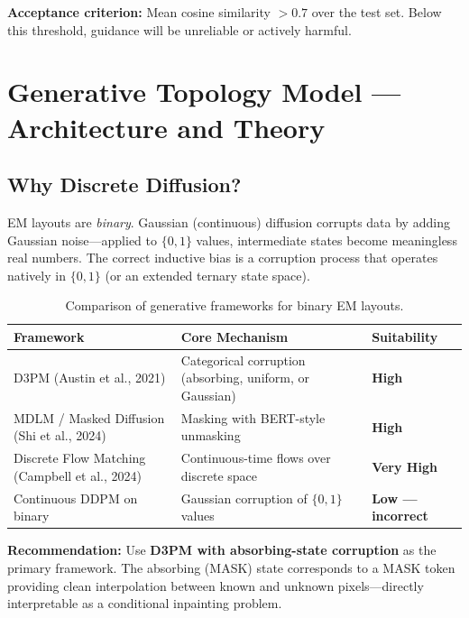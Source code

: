 \documentclass[12pt,a4paper]{article}
\theoremstyle{definition}
\theoremstyle{plain}
\theoremstyle{remark}
\begin{document}
\textbf{Acceptance criterion:} Mean cosine similarity $> 0.7$ over the test set.
Below this threshold, guidance will be unreliable or actively harmful.

\section{Generative Topology Model — Architecture and Theory}
\label{sec:generative}

\subsection{Why Discrete Diffusion?}

EM layouts are \emph{binary}.
Gaussian (continuous) diffusion corrupts data by adding Gaussian noise—applied to
$\{0,1\}$ values, intermediate states become meaningless real numbers.
The correct inductive bias is a corruption process that operates natively in
$\{0, 1\}$ (or an extended ternary state space).

\begin{table}[H]
\centering
\caption{Comparison of generative frameworks for binary EM layouts.}
\label{tab:gen_compare}
\begin{tabular}{lp{5.5cm}l}
\toprule
\textbf{Framework} & \textbf{Core Mechanism} & \textbf{Suitability} \\
\midrule
D3PM (Austin et al., 2021)
  & Categorical corruption (absorbing, uniform, or Gaussian)
  & \textbf{High} \\
MDLM / Masked Diffusion (Shi et al., 2024)
  & Masking with BERT-style unmasking
  & \textbf{High} \\
Discrete Flow Matching (Campbell et al., 2024)
  & Continuous-time flows over discrete space
  & \textbf{Very High} \\
Continuous DDPM on binary
  & Gaussian corruption of $\{0,1\}$ values
  & \textbf{Low — incorrect} \\
\bottomrule
\end{tabular}
\end{table}

\textbf{Recommendation:} Use \textbf{D3PM with absorbing-state corruption} as the
primary framework.
The absorbing (MASK) state corresponds to a MASK token providing clean interpolation
between known and unknown pixels—directly interpretable as a conditional inpainting
problem.
\end{document}

